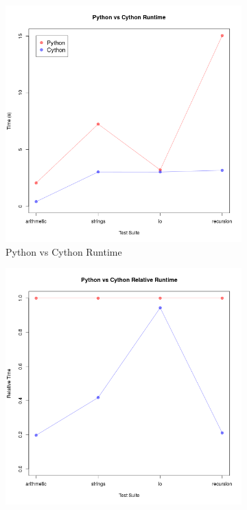 \begin{figure}[H]
\centering
\begin{subfigure}{.5\textwidth}
  \centering
  \includegraphics[width=\linewidth]{../src/Python_typed_vs_untyped.png}
  \caption{Python vs Cython Runtime}
  \label{fig:pythonCythonRaw}
\end{subfigure}%
\begin{subfigure}{.5\textwidth}
  \centering
  \includegraphics[width=\linewidth]{../src/Python_typed_vs_untyped_relative.png}

\end{subfigure}
\end{figure}
